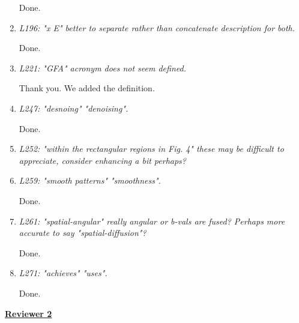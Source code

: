 \documentclass[a4paper,11pt,twoside]{report}
\begin{document}
\begin{enumerate}[resume]
    \hspace{1em} Done.

    \item \textit{L196: "x E" \textrightarrow better to separate rather than concatenate description for both.}

    \hspace{1em} Done.

    \item \textit{L221: "GFA" \textrightarrow acronym does not seem defined.}

    \hspace{1em} Thank you. We added the definition.

    \item \textit{L247: "desnoing" \textrightarrow "denoising".}

    \hspace{1em} Done.

    \item \textit{L252: "within the rectangular regions in Fig. 4" \textrightarrow these may be difficult to appreciate, consider enhancing a bit perhaps?}


    \item \textit{L259: "smooth patterns" \textrightarrow "smoothness".}

    \hspace{1em} Done.

    \item \textit{L261: "spatial-angular" \textrightarrow really angular or b-vals are fused? Perhaps more accurate to say "spatial-diffusion"?}

    \hspace{1em} Done.

    \item \textit{L271: "achieves" \textrightarrow "uses".}

    \hspace{1em} Done.

\end{enumerate}


\clearpage
\noindent \underline{\textbf{Reviewer 2}}
\end{document}
